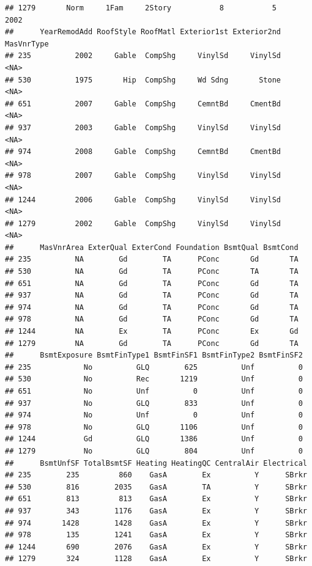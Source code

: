 \documentclass[]{article}
\begin{document}
\begin{verbatim}
## 1279       Norm     1Fam     2Story           8           5      2002
##      YearRemodAdd RoofStyle RoofMatl Exterior1st Exterior2nd MasVnrType
## 235          2002     Gable  CompShg     VinylSd     VinylSd       <NA>
## 530          1975       Hip  CompShg     Wd Sdng       Stone       <NA>
## 651          2007     Gable  CompShg     CemntBd     CmentBd       <NA>
## 937          2003     Gable  CompShg     VinylSd     VinylSd       <NA>
## 974          2008     Gable  CompShg     CemntBd     CmentBd       <NA>
## 978          2007     Gable  CompShg     VinylSd     VinylSd       <NA>
## 1244         2006     Gable  CompShg     VinylSd     VinylSd       <NA>
## 1279         2002     Gable  CompShg     VinylSd     VinylSd       <NA>
##      MasVnrArea ExterQual ExterCond Foundation BsmtQual BsmtCond
## 235          NA        Gd        TA      PConc       Gd       TA
## 530          NA        Gd        TA      PConc       TA       TA
## 651          NA        Gd        TA      PConc       Gd       TA
## 937          NA        Gd        TA      PConc       Gd       TA
## 974          NA        Gd        TA      PConc       Gd       TA
## 978          NA        Gd        TA      PConc       Gd       TA
## 1244         NA        Ex        TA      PConc       Ex       Gd
## 1279         NA        Gd        TA      PConc       Gd       TA
##      BsmtExposure BsmtFinType1 BsmtFinSF1 BsmtFinType2 BsmtFinSF2
## 235            No          GLQ        625          Unf          0
## 530            No          Rec       1219          Unf          0
## 651            No          Unf          0          Unf          0
## 937            No          GLQ        833          Unf          0
## 974            No          Unf          0          Unf          0
## 978            No          GLQ       1106          Unf          0
## 1244           Gd          GLQ       1386          Unf          0
## 1279           No          GLQ        804          Unf          0
##      BsmtUnfSF TotalBsmtSF Heating HeatingQC CentralAir Electrical
## 235        235         860    GasA        Ex          Y      SBrkr
## 530        816        2035    GasA        TA          Y      SBrkr
## 651        813         813    GasA        Ex          Y      SBrkr
## 937        343        1176    GasA        Ex          Y      SBrkr
## 974       1428        1428    GasA        Ex          Y      SBrkr
## 978        135        1241    GasA        Ex          Y      SBrkr
## 1244       690        2076    GasA        Ex          Y      SBrkr
## 1279       324        1128    GasA        Ex          Y      SBrkr

\end{verbatim}
\end{document}
